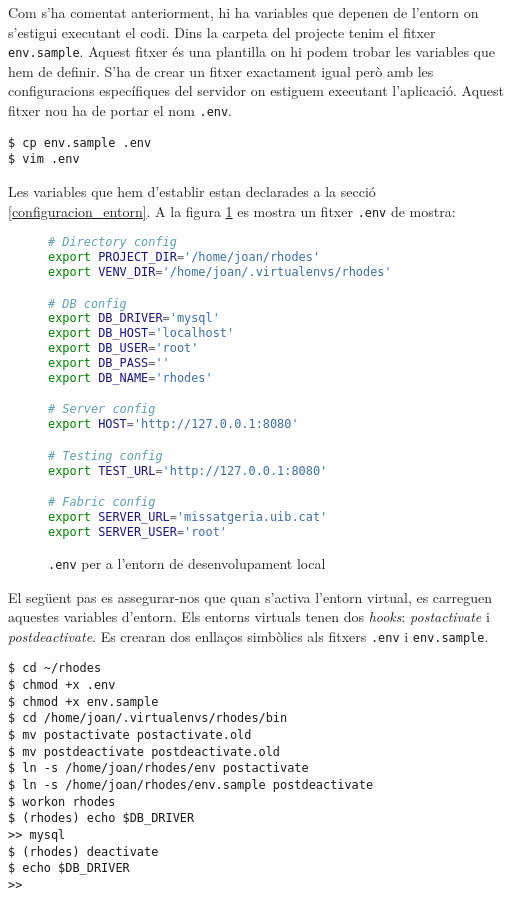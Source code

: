 Com s'ha comentat anteriorment, hi ha variables que depenen de l'entorn on s'estigui executant el codi. Dins la carpeta del projecte tenim el fitxer \texttt{env.sample}. Aquest fitxer és una plantilla on hi podem trobar les variables que hem de definir. S'ha de crear un fitxer exactament igual però amb les configuracions específiques del servidor on estiguem executant l'aplicació. Aquest fitxer nou ha de portar el nom \texttt{.env}.

\begin{verbatim}
$ cp env.sample .env
$ vim .env
\end{verbatim}

Les variables que hem d'establir estan declarades a la secció \ref{configuracion_entorn}. A la figura \ref{fig:env_sample} es mostra un fitxer \texttt{.env} de mostra:

\begin{figure}[h!]
	\begin{lstlisting}[language=bash]
# Directory config
export PROJECT_DIR='/home/joan/rhodes'
export VENV_DIR='/home/joan/.virtualenvs/rhodes'

# DB config
export DB_DRIVER='mysql'
export DB_HOST='localhost'
export DB_USER='root'
export DB_PASS=''
export DB_NAME='rhodes'

# Server config
export HOST='http://127.0.0.1:8080'

# Testing config
export TEST_URL='http://127.0.0.1:8080'

# Fabric config
export SERVER_URL='missatgeria.uib.cat'
export SERVER_USER='root'
	\end{lstlisting}
	\caption{\texttt{.env} per a l'entorn de desenvolupament local}
	\label{fig:env_sample}
\end{figure}

El següent pas es assegurar-nos que quan s'activa l'entorn virtual, es carreguen aquestes variables d'entorn. Els entorns virtuals tenen dos \emph{hooks}: \emph{postactivate} i \emph{postdeactivate}. Es crearan dos enllaços simbòlics als fitxers \texttt{.env} i \texttt{env.sample}.

\begin{verbatim}
$ cd ~/rhodes
$ chmod +x .env
$ chmod +x env.sample
$ cd /home/joan/.virtualenvs/rhodes/bin
$ mv postactivate postactivate.old
$ mv postdeactivate postdeactivate.old
$ ln -s /home/joan/rhodes/env postactivate
$ ln -s /home/joan/rhodes/env.sample postdeactivate
$ workon rhodes
$ (rhodes) echo $DB_DRIVER
>> mysql
$ (rhodes) deactivate
$ echo $DB_DRIVER
>>
\end{verbatim}

